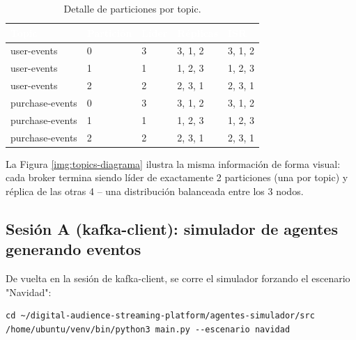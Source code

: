 \enabletablerowcolor[2]
\begin{table}[H]
\centering
\caption{Detalle de particiones por topic.}
\begin{tabular}{T{3cm}T{2cm}T{1.8cm}T{3cm}T{3cm}}
\hline
{}
\textcolor{white}{\textbf{Topic}} & \textcolor{white}{\textbf{Partición}} & \textcolor{white}{\textbf{Líder}} & \textcolor{white}{\textbf{Réplicas}} & \textcolor{white}{\textbf{ISR}} \bigstrut\\
\hline
user-events & 0 & 3 & 3, 1, 2 & 3, 1, 2 \\
user-events & 1 & 1 & 1, 2, 3 & 1, 2, 3 \\
user-events & 2 & 2 & 2, 3, 1 & 2, 3, 1 \\
purchase-events & 0 & 3 & 3, 1, 2 & 3, 1, 2 \\
purchase-events & 1 & 1 & 1, 2, 3 & 1, 2, 3 \\
purchase-events & 2 & 2 & 2, 3, 1 & 2, 3, 1 \\
\hline
\end{tabular}
\label{tab:topics-particiones}
\end{table}
\disabletablerowcolor

La Figura \ref{img:topics-diagrama} ilustra la misma información de forma visual: cada broker termina siendo líder de exactamente 2 particiones (una por topic) y réplica de las otras 4 -- una distribución balanceada entre los 3 nodos.


\subsection{Sesión A (kafka-client): simulador de agentes generando eventos}

De vuelta en la sesión de kafka-client, se corre el simulador forzando el escenario "Navidad":

\begin{lstlisting}[style=cmdbox]
cd ~/digital-audience-streaming-platform/agentes-simulador/src
/home/ubuntu/venv/bin/python3 main.py --escenario navidad
\end{lstlisting}

